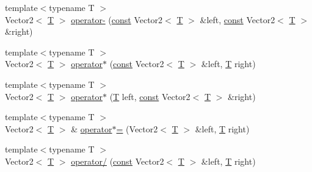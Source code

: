\begin{DoxyCompactItemize}
\item 
{\footnotesize template$<$typename T $>$ }\\Vector2$<$ \hyperlink{curses_8priv_8h_a5ef253115820acf7d27f3c5c3b02a0f0}{T} $>$ \hyperlink{sfml_2dep_2_s_f_m_l-2_84_82_2include_2_s_f_m_l_2_system_2_vector2_8inl_ad844643fc6fb0eea05a382b318ae5259}{operator-\/} (\hyperlink{term__entry_8h_a57bd63ce7f9a353488880e3de6692d5a}{const} Vector2$<$ \hyperlink{curses_8priv_8h_a5ef253115820acf7d27f3c5c3b02a0f0}{T} $>$ \&left, \hyperlink{term__entry_8h_a57bd63ce7f9a353488880e3de6692d5a}{const} Vector2$<$ \hyperlink{curses_8priv_8h_a5ef253115820acf7d27f3c5c3b02a0f0}{T} $>$ \&right)
\item 
{\footnotesize template$<$typename T $>$ }\\Vector2$<$ \hyperlink{curses_8priv_8h_a5ef253115820acf7d27f3c5c3b02a0f0}{T} $>$ \hyperlink{sfml_2dep_2_s_f_m_l-2_84_82_2include_2_s_f_m_l_2_system_2_vector2_8inl_a4bcfa0548660237aec2f1fdfd000a30f}{operator$\ast$} (\hyperlink{term__entry_8h_a57bd63ce7f9a353488880e3de6692d5a}{const} Vector2$<$ \hyperlink{curses_8priv_8h_a5ef253115820acf7d27f3c5c3b02a0f0}{T} $>$ \&left, \hyperlink{curses_8priv_8h_a5ef253115820acf7d27f3c5c3b02a0f0}{T} right)
\item 
{\footnotesize template$<$typename T $>$ }\\Vector2$<$ \hyperlink{curses_8priv_8h_a5ef253115820acf7d27f3c5c3b02a0f0}{T} $>$ \hyperlink{sfml_2dep_2_s_f_m_l-2_84_82_2include_2_s_f_m_l_2_system_2_vector2_8inl_afe4ec033f7e7061b5693a7dbcdecf96e}{operator$\ast$} (\hyperlink{curses_8priv_8h_a5ef253115820acf7d27f3c5c3b02a0f0}{T} left, \hyperlink{term__entry_8h_a57bd63ce7f9a353488880e3de6692d5a}{const} Vector2$<$ \hyperlink{curses_8priv_8h_a5ef253115820acf7d27f3c5c3b02a0f0}{T} $>$ \&right)
\item 
{\footnotesize template$<$typename T $>$ }\\Vector2$<$ \hyperlink{curses_8priv_8h_a5ef253115820acf7d27f3c5c3b02a0f0}{T} $>$ \& \hyperlink{sfml_2dep_2_s_f_m_l-2_84_82_2include_2_s_f_m_l_2_system_2_vector2_8inl_af8c6cb01ae7604914f9ea350793712bb}{operator$\ast$=} (Vector2$<$ \hyperlink{curses_8priv_8h_a5ef253115820acf7d27f3c5c3b02a0f0}{T} $>$ \&left, \hyperlink{curses_8priv_8h_a5ef253115820acf7d27f3c5c3b02a0f0}{T} right)
\item 
{\footnotesize template$<$typename T $>$ }\\Vector2$<$ \hyperlink{curses_8priv_8h_a5ef253115820acf7d27f3c5c3b02a0f0}{T} $>$ \hyperlink{sfml_2dep_2_s_f_m_l-2_84_82_2include_2_s_f_m_l_2_system_2_vector2_8inl_a1a55a08f8d786e49995d2b162d0ef922}{operator/} (\hyperlink{term__entry_8h_a57bd63ce7f9a353488880e3de6692d5a}{const} Vector2$<$ \hyperlink{curses_8priv_8h_a5ef253115820acf7d27f3c5c3b02a0f0}{T} $>$ \&left, \hyperlink{curses_8priv_8h_a5ef253115820acf7d27f3c5c3b02a0f0}{T} right)

\end{DoxyCompactItemize}
